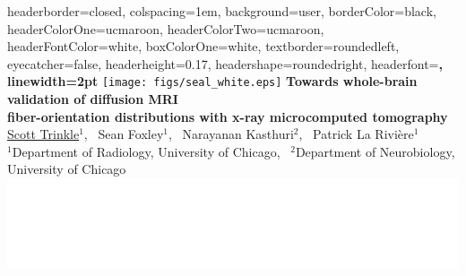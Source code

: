 \documentclass[landscape,a0paper,fontscale=0.36]{baposter} %
\begin{document}

\begin{poster}
{
headerborder=closed, %
colspacing=1em, %
background=user,
borderColor=black, %
headerColorOne=ucmaroon, %
headerColorTwo=ucmaroon, %
headerFontColor=white, %
boxColorOne=white, %
textborder=roundedleft, %
eyecatcher=false, %
headerheight=0.17\textheight, %
headershape=roundedright, %
headerfont=\Large\bf\textsc, %
linewidth=2pt %
}
%
{\texttt{[image: figs/seal\_white.eps]}} %
{\color{white}\Huge{\bf Towards whole-brain validation of diffusion MRI \\[6pt]fiber-orientation distributions with x-ray microcomputed tomography}\vspace{0.75em}} %
{\color{white}\LARGE{\underline{Scott Trinkle}$^{1}$, \ Sean Foxley$^{1}$, \ Narayanan Kasthuri$^{2}$, \ Patrick La Rivi\`ere$^{1}$} \vspace{0.35em}\\
  \normalsize{$^{1}$Department of Radiology, University of Chicago, \ $^{2}$Department of Neurobiology, University of Chicago}} %
{\includegraphics[height=0.45\headerheight]{figs/logos/logo_white.eps}} %


\end{poster}
\end{document}
